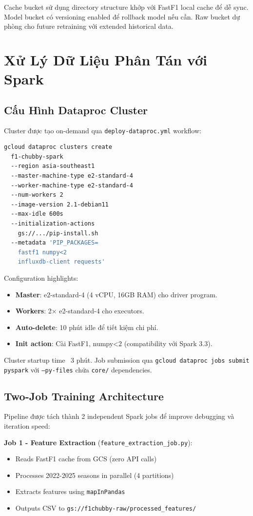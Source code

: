 \documentclass[conference,10pt]{IEEEtran}
\begin{document}
Cache bucket sử dụng directory structure khớp với FastF1 local cache để dễ sync. Model bucket có versioning enabled để rollback model nếu cần. Raw bucket dự phòng cho future retraining với extended historical data.

\section{Xử Lý Dữ Liệu Phân Tán với Spark}

\subsection{Cấu Hình Dataproc Cluster}

Cluster được tạo on-demand qua \texttt{deploy-dataproc.yml} workflow:

\begin{lstlisting}[language=bash]
gcloud dataproc clusters create
  f1-chubby-spark
  --region asia-southeast1
  --master-machine-type e2-standard-4
  --worker-machine-type e2-standard-4
  --num-workers 2
  --image-version 2.1-debian11
  --max-idle 600s
  --initialization-actions
    gs://.../pip-install.sh
  --metadata 'PIP_PACKAGES=
    fastf1 numpy<2
    influxdb-client requests'
\end{lstlisting}

Configuration highlights:
\begin{itemize}
    \item \textbf{Master}: e2-standard-4 (4 vCPU, 16GB RAM) cho driver program.
    \item \textbf{Workers}: 2× e2-standard-4 cho executors.
    \item \textbf{Auto-delete}: 10 phút idle để tiết kiệm chi phí.
    \item \textbf{Init action}: Cài FastF1, numpy<2 (compatibility với Spark 3.3).
\end{itemize}

Cluster startup time ~3 phút. Job submission qua \texttt{gcloud dataproc jobs submit pyspark} với \texttt{--py-files} chứa \texttt{core/} dependencies.

\subsection{Two-Job Training Architecture}

Pipeline được tách thành 2 independent Spark jobs để improve debugging và iteration speed:

\textbf{Job 1 - Feature Extraction} (\texttt{feature\_extraction\_job.py}):
\begin{itemize}
    \item Reads FastF1 cache from GCS (zero API calls)
    \item Processes 2022-2025 seasons in parallel (4 partitions)
    \item Extracts features using \texttt{mapInPandas}
    \item Outputs CSV to \texttt{gs://f1chubby-raw/processed\_features/}
\end{itemize}
\end{document}
